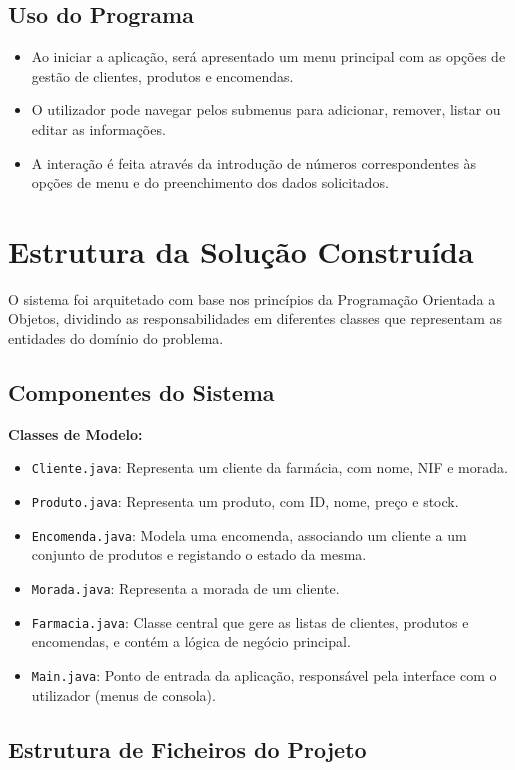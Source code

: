 \documentclass[a4paper,12pt]{article}
\begin{document}
\subsection{Uso do Programa}
\begin{itemize}
    \item Ao iniciar a aplicação, será apresentado um menu principal com as opções de gestão de clientes, produtos e encomendas.
    \item O utilizador pode navegar pelos submenus para adicionar, remover, listar ou editar as informações.
    \item A interação é feita através da introdução de números correspondentes às opções de menu e do preenchimento dos dados solicitados.
\end{itemize}

\section{Estrutura da Solução Construída}
O sistema foi arquitetado com base nos princípios da Programação Orientada a Objetos, dividindo as responsabilidades em diferentes classes que representam as entidades do domínio do problema.

\subsection{Componentes do Sistema}
\textbf{Classes de Modelo:} 
\begin{itemize}
    \item \texttt{Cliente.java}: Representa um cliente da farmácia, com nome, NIF e morada.
    \item \texttt{Produto.java}: Representa um produto, com ID, nome, preço e stock.
    \item \texttt{Encomenda.java}: Modela uma encomenda, associando um cliente a um conjunto de produtos e registando o estado da mesma.
    \item \texttt{Morada.java}: Representa a morada de um cliente.
    \item \texttt{Farmacia.java}: Classe central que gere as listas de clientes, produtos e encomendas, e contém a lógica de negócio principal.
    \item \texttt{Main.java}: Ponto de entrada da aplicação, responsável pela interface com o utilizador (menus de consola).
\end{itemize}

\subsection{Estrutura de Ficheiros do Projeto}
\end{document}
